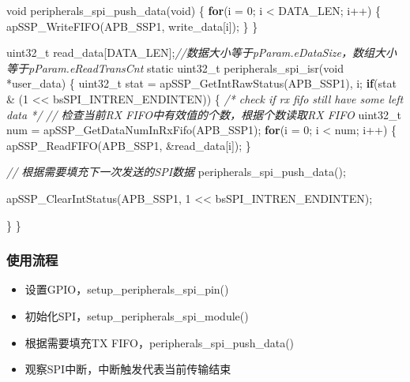 \documentclass[
  12pt,
]{book}
\newenvironment{Shaded}{\begin{snugshade}}{\end{snugshade}}
\newcommand{\CommentTok}[1]{\textcolor[rgb]{0.56,0.35,0.01}{\textit{#1}}}
\newcommand{\ControlFlowTok}[1]{\textcolor[rgb]{0.13,0.29,0.53}{\textbf{#1}}}
\newcommand{\DataTypeTok}[1]{\textcolor[rgb]{0.13,0.29,0.53}{#1}}
\newcommand{\DecValTok}[1]{\textcolor[rgb]{0.00,0.00,0.81}{#1}}
\newcommand{\NormalTok}[1]{#1}
\providecommand{\tightlist}{%
  \setlength{\itemsep}{0pt}\setlength{\parskip}{0pt}}
\begin{document}
\begin{Shaded}
\begin{Highlighting}[]
\DataTypeTok{void}\NormalTok{ peripherals_spi_push_data(}\DataTypeTok{void}\NormalTok{)}
\NormalTok{\{}
    \ControlFlowTok{for}\NormalTok{(i = }\DecValTok{0}\NormalTok{; i < DATA_LEN; i++)}
\NormalTok{    \{}
\NormalTok{      apSSP_WriteFIFO(APB_SSP1, write_data[i]);}
\NormalTok{    \}}
\NormalTok{\}}

\DataTypeTok{uint32_t}\NormalTok{ read_data[DATA_LEN];}\CommentTok{//数据大小等于pParam.eDataSize，数组大小等于pParam.eReadTransCnt}
\DataTypeTok{static} \DataTypeTok{uint32_t}\NormalTok{ peripherals_spi_isr(}\DataTypeTok{void}\NormalTok{ *user_data)}
\NormalTok{\{}
  \DataTypeTok{uint32_t}\NormalTok{ stat = apSSP_GetIntRawStatus(APB_SSP1), i;}
  \ControlFlowTok{if}\NormalTok{(stat & (}\DecValTok{1}\NormalTok{ << bsSPI_INTREN_ENDINTEN))}
\NormalTok{  \{}
    \CommentTok{/* check if rx fifo still have some left data */}
    \CommentTok{// 检查当前RX FIFO中有效值的个数，根据个数读取RX FIFO}
    \DataTypeTok{uint32_t}\NormalTok{ num = apSSP_GetDataNumInRxFifo(APB_SSP1);}
    \ControlFlowTok{for}\NormalTok{(i = }\DecValTok{0}\NormalTok{; i < num; i++)}
\NormalTok{    \{}
\NormalTok{      apSSP_ReadFIFO(APB_SSP1, &read_data[i]);}
\NormalTok{    \}}

    \CommentTok{// 根据需要填充下一次发送的SPI数据}
\NormalTok{    peripherals_spi_push_data();}
    
\NormalTok{    apSSP_ClearIntStatus(APB_SSP1, }\DecValTok{1}\NormalTok{ << bsSPI_INTREN_ENDINTEN);}
    
\NormalTok{  \}}
\NormalTok{\}}
\end{Highlighting}
\end{Shaded}

\hypertarget{ux4f7fux7528ux6d41ux7a0b-15}{%
\subsubsection{使用流程}\label{ux4f7fux7528ux6d41ux7a0b-15}}

\begin{itemize}
\tightlist
\item
  设置GPIO，setup\_peripherals\_spi\_pin()
\item
  初始化SPI，setup\_peripherals\_spi\_module()
\item
  根据需要填充TX FIFO，peripherals\_spi\_push\_data()
\item
  观察SPI中断，中断触发代表当前传输结束
\end{itemize}
\end{document}
